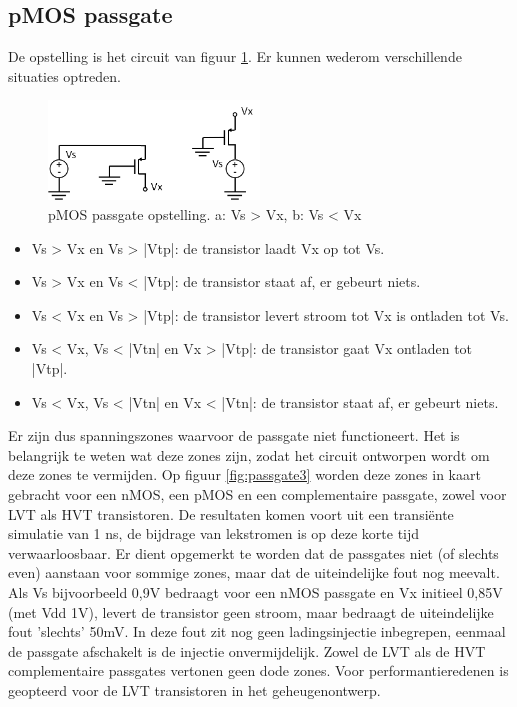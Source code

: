 \subsection{pMOS passgate}
De opstelling is het circuit van figuur \ref{fig:passgate2}. Er kunnen wederom verschillende situaties optreden.

\begin{figure}[h!]
  \centering
  \includegraphics[width=0.5\textwidth]{../fig/hfdst-periphery-passgate2.png}
  \caption[pMOS passgate]{pMOS passgate opstelling. a: Vs > Vx, b: Vs < Vx}
  \label{fig:passgate2}
\end{figure}

\begin{itemize}
\item Vs > Vx en Vs > |Vtp|: de transistor laadt Vx op tot Vs.
\item Vs > Vx en Vs < |Vtp|: de transistor staat af, er gebeurt niets.
\item Vs < Vx en Vs > |Vtp|: de transistor levert stroom tot Vx is ontladen tot Vs.
\item Vs < Vx, Vs < |Vtn| en Vx > |Vtp|: de transistor gaat Vx ontladen tot |Vtp|.
\item Vs < Vx, Vs < |Vtn| en Vx < |Vtn|: de transistor staat af, er gebeurt niets.
\end{itemize}

Er zijn dus spanningszones waarvoor de passgate niet functioneert. Het is belangrijk te weten wat deze zones zijn, zodat het circuit ontworpen wordt om deze zones te vermijden. 
Op figuur \ref{fig:passgate3} worden deze zones in kaart gebracht voor een nMOS, een pMOS en een complementaire passgate, zowel voor LVT als HVT transistoren. De resultaten komen voort uit een transiënte simulatie van 1 ns, de bijdrage van lekstromen is op deze korte tijd verwaarloosbaar. Er dient opgemerkt te worden dat de passgates niet (of slechts even) aanstaan voor sommige zones, maar dat de uiteindelijke fout nog meevalt.
Als Vs bijvoorbeeld 0,9V bedraagt voor een nMOS passgate en Vx initieel 0,85V (met Vdd 1V), levert de transistor geen stroom, maar bedraagt de uiteindelijke fout 'slechts' 50mV.
In deze fout zit nog geen ladingsinjectie inbegrepen, eenmaal de passgate afschakelt is de injectie onvermijdelijk.
Zowel de LVT als de HVT complementaire passgates vertonen geen dode zones. Voor performantieredenen is geopteerd voor de LVT transistoren in het geheugenontwerp.

